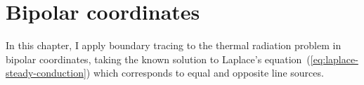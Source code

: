 \chapter{Bipolar coordinates}
\label{ch:bipolar}

In this chapter, I apply boundary tracing to the thermal radiation problem
in bipolar coordinates,
taking the known solution
to Laplace's equation~(\ref{eq:laplace-steady-conduction})
which corresponds to equal and opposite line sources.
